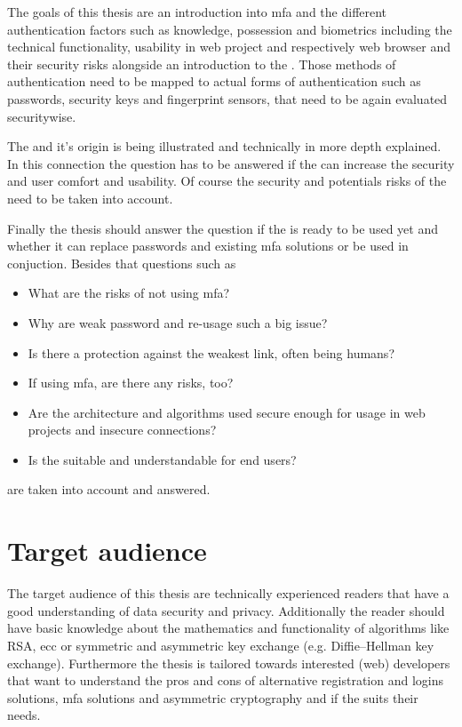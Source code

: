 The goals of this thesis are an introduction into \gls{mfa} and the different authentication factors such as \frqq knowledge, possession and biometrics\flqq{} including the technical functionality, usability in web project and respectively web browser and their security risks alongside an introduction to the \wa. Those methods of authentication need to be mapped to actual forms of authentication such as passwords, security keys and fingerprint sensors, that need to be again evaluated securitywise.

The \wa{} and it's origin is being illustrated and technically in more depth explained. In this connection the question has to be answered if the \wa{} can increase the security and user comfort and usability. Of course the security and potentials risks of the \wa{} need to be taken into account.

Finally the thesis should answer the question if the \wa{} is ready to be used yet and whether it can replace passwords and existing \gls{mfa} solutions or be used in conjuction.
Besides that questions such as

\begin{itemize}
	\item What are the risks of not using \gls{mfa}?
	\item Why are weak password and re-usage such a big issue?
	\item Is there a protection against the weakest link, often being humans?
	\item If using \gls{mfa}, are there any risks, too?
	\item Are the architecture and algorithms used secure enough for usage in web projects and insecure connections?
	\item Is the \wa suitable and understandable for end users?
\end{itemize}

are taken into account and answered.

\section{Target audience}

The target audience of this thesis are technically experienced readers that have a good understanding of data security and privacy. Additionally the reader should have basic knowledge about the mathematics and functionality of algorithms like RSA, \gls{ecc} or symmetric and asymmetric key exchange (e.g. Diffie–Hellman key exchange). Furthermore the thesis is tailored towards interested (web) developers that want to understand the pros and cons of alternative registration and logins solutions, \gls{mfa} solutions and asymmetric cryptography and if the \wa{} suits their needs.

